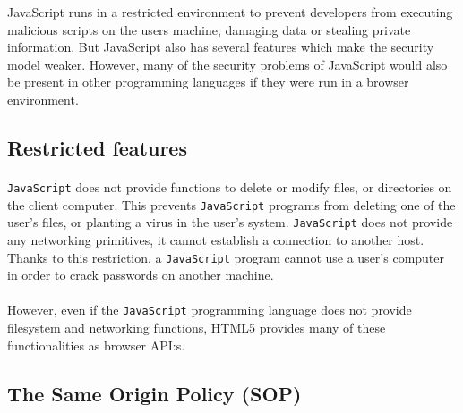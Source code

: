 JavaScript runs in a restricted environment to prevent developers from executing malicious scripts on the users machine, damaging data or stealing private information. But JavaScript also has several features which make the security model weaker. However, many of the security problems of JavaScript would also be present in other programming languages if they were run in a browser environment.

\subsection{Restricted features}

\paragraph{}
\texttt{JavaScript} does not provide functions to delete or modify files, or directories on the client computer. This prevents \texttt{JavaScript} programs from deleting one of the user's files, or planting a virus in the user's system. \texttt{JavaScript} does not provide any networking primitives, it cannot establish a connection to another host. Thanks to this restriction, a \texttt{JavaScript} program cannot use a user's computer in order to crack passwords on another machine.

\paragraph{}
However, even if the \texttt{JavaScript} programming language does not provide filesystem and networking functions, HTML5 provides many of these functionalities as browser API:s.

\subsection{The Same Origin Policy (SOP)}

